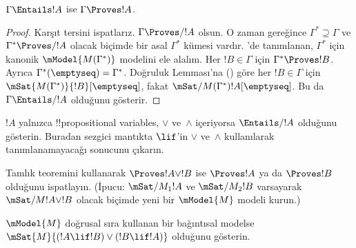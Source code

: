 \documentclass[../../../include/open-logic-section]{subfiles}
\begin{document}


\begin{thm}
  $\Gamma\Entails !A$ ise $\Gamma\Proves !A$.
\end{thm}

\begin{proof}
  Karşıt tersini ispatlarız. $\Gamma\Proves/ !A$ olsun. O zaman
   gereğince $\Gamma^*\supseteq\Gamma$ ve
  $\Gamma^*\Proves/ !A$ olacak biçimde bir asal $\Gamma^*$ kümesi vardır.
  'de tanımlanan, $\Gamma^*$ için
  kanonik $\mModel{M(\Gamma^*)}$ modelini ele alalım. Her
  $!B\in\Gamma$ için $\Gamma^*\Proves !B$. Ayrıca
  $\Gamma^*(\emptyseq)=\Gamma^*$. Doğruluk Lemması'na
  () göre her $!B\in\Gamma$ için
  $\mSat{M(\Gamma^*)}{!B}[\emptyseq]$, fakat
  $\mSat/{M(\Gamma^*)}{!A}[\emptyseq]$. Bu da
  $\Gamma\Entails/ !A$ olduğunu gösterir.
\end{proof}

\begin{prob}
  $!A$ yalnızca !!{propositional variable}s, $\lor$ ve~$\land$ içeriyorsa
  $\Entails/ !A$ olduğunu gösterin. Buradan sezgici mantıkta $\lif$'in
  $\lor$ ve~$\land$ kullanılarak tanımlanamayacağı sonucunu çıkarın.
\end{prob}

\begin{prob}
  Tamlık teoremini kullanarak $\Proves !A\lor !B$ ise $\Proves !A$ ya da
  $\Proves !B$ olduğunu ispatlayın. (İpucu: $\mSat/{M_1}{!A}$ ve
  $\mSat/{M_2}{!B}$ varsayarak $\mSat/{M}{!A\lor !B}$ olacak biçimde yeni
  bir $\mModel{M}$ modeli kurun.)
\end{prob}

\begin{prob}
  $\mModel{M}$ doğrusal sıra kullanan bir bağıntısal modelse
  $\mSat{M}{(!A\lif !B)\lor(!B\lif !A)}$ olduğunu gösterin.
\end{prob}
\end{document}
